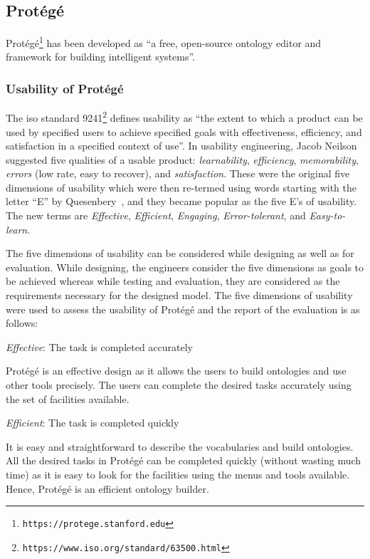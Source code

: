\begin{doublespace}
\subsection{Protégé}
\label{subsec:protege}

Protégé\footnote{\tt https://protege.stanford.edu} has been developed as
``a free, open-source ontology editor and framework for building intelligent systems''.

\subsubsection{Usability of Protégé}
\label{subsubsec:usabilityofprotege}

The \ac{iso} standard 9241\footnote{\tt https://www.iso.org/standard/63500.html} 
defines usability as 
``the extent to which a product can be used by specified users 
to achieve specified goals with effectiveness, efficiency, 
and satisfaction in a specified context of use''. 
In usability engineering, 
Jacob Neilson~\cite{neilson1994usability} 
suggested five qualities of a usable product: 
{\em learnability}, {\em efficiency}, {\em memorability}, 
{\em errors} (low rate, easy to recover), and {\em satisfaction}. 
These were the original five dimensions of usability 
which were then re-termed using words starting with the letter
``E'' by Quesenbery~\cite{quesenbery2003dimensions}, 
and they became popular as the five E's of usability. 
The new terms are 
{\em Effective}, 
{\em Efficient}, 
{\em Engaging}, 
{\em Error-tolerant}, and 
{\em Easy-to-learn}.

The five dimensions of usability can be considered 
while designing as well as for evaluation. 
While designing, 
the engineers consider the five dimensions as goals to be achieved 
whereas while testing and evaluation, 
they are considered as the requirements necessary for the designed model. 
The five dimensions of usability were used to assess the usability of Protégé and 
the report of the evaluation is as follows:

\emph{Effective}: The task is completed accurately

Protégé is an effective design as it allows the users to build ontologies and 
use other tools precisely. 
The users can complete the desired tasks accurately 
using the set of facilities available.

\emph{Efficient}: The task is completed quickly

It is easy and straightforward to describe the vocabularies and build ontologies. 
All the desired tasks in Protégé can be completed quickly 
(without wasting much time) 
as it is easy to look for the facilities using the menus and tools available. 
Hence, 
Protégé is an efficient ontology builder.


\end{doublespace}
